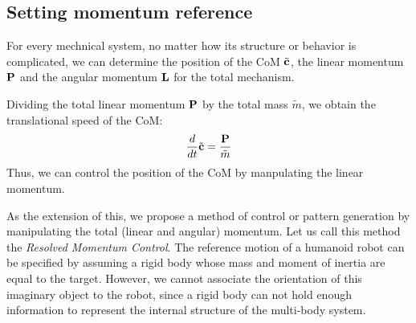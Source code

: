 \subsection{Setting momentum reference}

For every mechnical system, no matter how its structure or behavior is complicated,
we can determine the position of the CoM $\tilde{\bf c}$,
the linear momentum ${\bf P}$ and the angular momentum ${\bf L}$
for the total mechanism.
\par
Dividing the total linear momentum ${\bf P}$  by the total mass $\tilde{m}$,
we obtain the translational speed of the CoM:
\begin{equation}
\frac{d}{dt}\tilde{\bf c} = \frac{\bf P}{\tilde{m}}
\end{equation}
Thus, we can control the position of the CoM by manpulating the linear momentum.
\par
As the extension of this, we propose a method of control or pattern generation
by manipulating the total (linear and angular) momentum. Let us call this
method the \textit{Resolved Momentum Control}. The reference motion of a humanoid robot
 can be specified by assuming a rigid body whose mass and moment of inertia
are equal to the target. However, we cannot associate the orientation of this
imaginary object to the robot, since a rigid body can not hold enough information
to represent the internal structure of the multi-body system.

